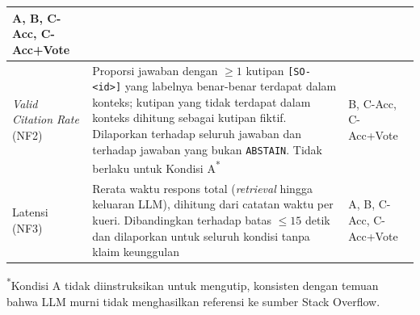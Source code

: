 \begin{table}[!htbp]
\begin{tabularx}{\textwidth}{|>{\raggedright\arraybackslash}p{3.2cm}|>{\raggedright\arraybackslash}X|>{\raggedright\arraybackslash}p{2.2cm}|}
    A, B, C-Acc, C-Acc+Vote \\
\hline
\emph{Valid Citation Rate} (NF2) &
    Proporsi jawaban dengan $\geq 1$ kutipan \texttt{[SO-<id>]} yang labelnya benar-benar terdapat dalam konteks; kutipan yang tidak terdapat dalam konteks dihitung sebagai kutipan fiktif. Dilaporkan terhadap seluruh jawaban dan terhadap jawaban yang bukan \texttt{ABSTAIN}. Tidak berlaku untuk Kondisi A\textsuperscript{*} &
    B, C-Acc, C-Acc+Vote \\
\hline
Latensi (NF3) &
    Rerata waktu respons total (\emph{retrieval} hingga keluaran LLM), dihitung dari catatan waktu per kueri. Dibandingkan terhadap batas $\leq 15$ detik dan dilaporkan untuk seluruh kondisi tanpa klaim keunggulan &
    A, B, C-Acc, C-Acc+Vote \\
\hline
\end{tabularx}

\vspace{0.1cm}
\raggedright\footnotesize
\textsuperscript{*}Kondisi A tidak diinstruksikan untuk mengutip, konsisten dengan temuan \textcite{DaSilva2025} bahwa LLM murni tidak menghasilkan referensi ke sumber Stack Overflow.
\end{table}